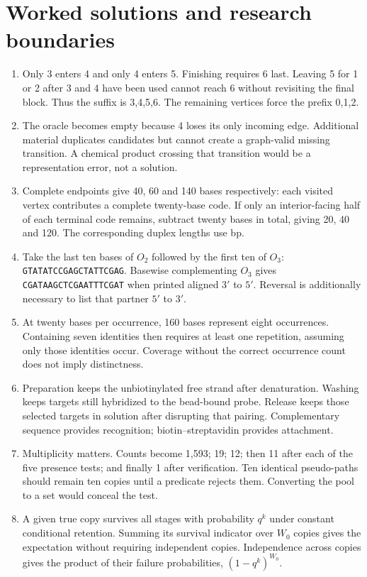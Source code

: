 \section{Worked solutions and research boundaries}
\begin{enumerate}
\item Only 3 enters 4 and only 4 enters 5. Finishing requires 6 last. Leaving 5 for 1 or 2 after 3 and 4 have been used cannot reach 6 without revisiting the final block. Thus the suffix is 3,4,5,6. The remaining vertices force the prefix 0,1,2.
\item The oracle becomes empty because 4 loses its only incoming edge. Additional material duplicates candidates but cannot create a graph-valid missing transition. A chemical product crossing that transition would be a representation error, not a solution.
\item Complete endpoints give 40, 60 and 140 bases respectively: each visited vertex contributes a complete twenty-base code. If only an interior-facing half of each terminal code remains, subtract twenty bases in total, giving 20, 40 and 120. The corresponding duplex lengths use bp.
\item Take the last ten bases of $O_2$ followed by the first ten of $O_3$: \texttt{GTATATCCGAGCTATTCGAG}. Basewise complementing $O_3$ gives \texttt{CGATAAGCTCGAATTTCGAT} when printed aligned $3'$ to $5'$. Reversal is additionally necessary to list that partner $5'$ to $3'$.
\item At twenty bases per occurrence, 160 bases represent eight occurrences. Containing seven identities then requires at least one repetition, assuming only those identities occur. Coverage without the correct occurrence count does not imply distinctness.
\item Preparation keeps the unbiotinylated free strand after denaturation. Washing keeps targets still hybridized to the bead-bound probe. Release keeps those selected targets in solution after disrupting that pairing. Complementary sequence provides recognition; biotin--streptavidin provides attachment.
\item Multiplicity matters. Counts become 1,593; 19; 12; then 11 after each of the five presence tests; and finally 1 after verification. Ten identical pseudo-paths should remain ten copies until a predicate rejects them. Converting the pool to a set would conceal the test.
\item A given true copy survives all stages with probability $q^k$ under constant conditional retention. Summing its survival indicator over $W_0$ copies gives the expectation without requiring independent copies. Independence across copies gives the product of their failure probabilities, $(1-q^k)^{W_0}$.

\end{enumerate}
